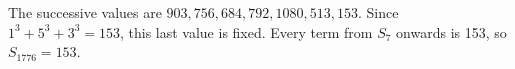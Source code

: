 The successive values are $903,756,684,792,1080,513,153$. Since $1^3+5^3+3^3=153$, this last value is fixed. Every term from $S_7$ onwards is 153, so $\boxed{S_{1776}=153}$.
